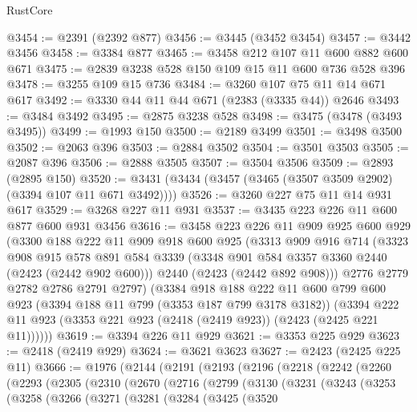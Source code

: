 \begin{lexlean}{RustCore}
\begin{coremodule}
@3454 := @2391 (@2392 @877)
@3456 := @3445 (@3452 @3454)
@3457 := @3442 @3456
@3458 := @3384 @877
@3465 := @3458 @212 @107 @11 @600 @882 @600 @671
@3475 := @2839 @3238 @528 @150 @109 @15 @11 @600 @736 @528 @396
@3478 := @3255 @109 @15 @736
@3484 := @3260 @107 @75 @11 @14 @671 @617
@3492 := @3330 @44 @11 @44 @671 (@2383 (@3335 @44)) @2646
@3493 := @3484 @3492
@3495 := @2875 @3238 @528
@3498 := @3475 (@3478 (@3493 @3495))
@3499 := @1993 @150
@3500 := @2189 @3499
@3501 := @3498 @3500
@3502 := @2063 @396
@3503 := @2884 @3502
@3504 := @3501 @3503
@3505 := @2087 @396
@3506 := @2888 @3505
@3507 := @3504 @3506
@3509 := @2893 (@2895 @150)
@3520 := @3431 (@3434 (@3457 (@3465 (@3507 @3509 @2902) (@3394 @107 @11 @671 @3492))))
@3526 := @3260 @227 @75 @11 @14 @931 @617
@3529 := @3268 @227 @11 @931
@3537 := @3435 @223 @226 @11 @600 @877 @600 @931 @3456
@3616 := @3458
    @223
    @226
    @11
    @909
    @925
    @600
    @929
    (@3300
      @188
      @222
      @11
      @909
      @918
      @600
      @925
      (@3313
        @909
        @916
        @714
        (@3323
          @908
          @915
          @578
          @891
          @584
          @3339
          (@3348 @901 @584 @3357 @3360 @2440 (@2423 (@2442 @902 @600)))
          @2440
          (@2423 (@2442 @892 @908)))
        @2776
        @2779
        @2782
        @2786
        @2791
        @2797)
      (@3384
        @918
        @188
        @222
        @11
        @600
        @799
        @600
        @923
        (@3394 @188 @11 @799 (@3353 @187 @799 @3178 @3182))
        (@3394 @222 @11 @923 (@3353 @221 @923 (@2418 (@2419 @923)) (@2423 (@2425 @221 @11))))))
@3619 := @3394 @226 @11 @929
@3621 := @3353 @225 @929
@3623 := @2418 (@2419 @929)
@3624 := @3621 @3623
@3627 := @2423 (@2425 @225 @11)
@3666 := @1976
    (@2144
      (@2191
        (@2193
          (@2196
            (@2218
              (@2242
                (@2260
                  (@2293
                    (@2305
                      (@2310
                        (@2670
                          (@2716
                            (@2799
                              (@3130
                                (@3231
                                  (@3243
                                    (@3253
                                      (@3258
                                        (@3266
                                          (@3271
                                            (@3281
                                              (@3284
                                                (@3425
                                                  (@3520

\end{coremodule}
\end{lexlean}
